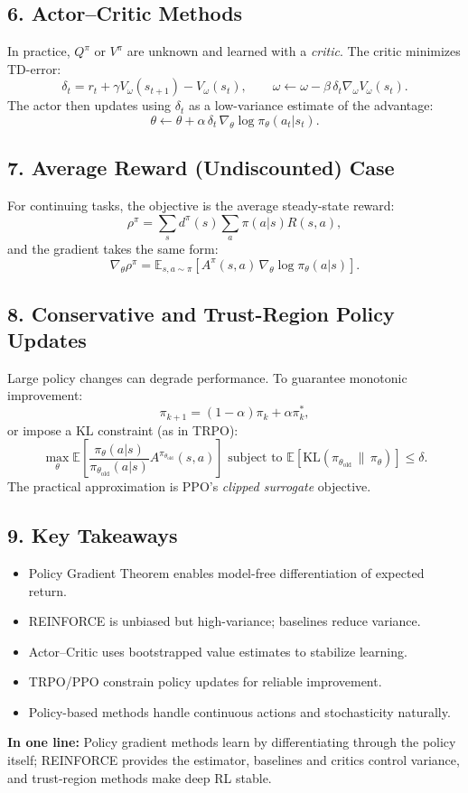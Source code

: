 \subsection*{6. Actor--Critic Methods}

In practice, $Q^\pi$ or $V^\pi$ are unknown and learned with a \emph{critic}.
The critic minimizes TD-error:
\[
		\delta_t = r_t + \gamma V_\omega(s_{t+1}) - V_\omega(s_t),
		\qquad
		\omega \leftarrow \omega - \beta \, \delta_t \nabla_\omega V_\omega(s_t).
\]
The actor then updates using $\delta_t$ as a low-variance estimate of the advantage:
\[
		\theta \leftarrow \theta + \alpha \, \delta_t \, \nabla_\theta \log \pi_\theta(a_t|s_t).
\]

\subsection*{7. Average Reward (Undiscounted) Case}

For continuing tasks, the objective is the average steady-state reward:
\[
		\rho^\pi = \sum_s d^\pi(s) \sum_a \pi(a|s) R(s,a),
\]
and the gradient takes the same form:
\[
		\nabla_\theta \rho^\pi
		= \mathbb{E}_{s,a \sim \pi}\!\left[
				A^\pi(s,a)\,\nabla_\theta \log \pi_\theta(a|s)
		\right].
\]

\subsection*{8. Conservative and Trust-Region Policy Updates}

Large policy changes can degrade performance.
To guarantee monotonic improvement:
\[
		\pi_{k+1} = (1-\alpha)\pi_k + \alpha \pi^*_k,
\]
or impose a KL constraint (as in TRPO):
\[
		\max_\theta
		\mathbb{E}\left[
				\frac{\pi_\theta(a|s)}{\pi_{\theta_{\text{old}}}(a|s)} A^{\pi_{\theta_{\text{old}}}}(s,a)
		\right]
		\text{ subject to }
		\mathbb{E}\!\left[ \mathrm{KL}(\pi_{\theta_{\text{old}}}\,\|\,\pi_\theta) \right] \le \delta.
\]
The practical approximation is PPO’s \emph{clipped surrogate} objective.

\subsection*{9. Key Takeaways}

\begin{itemize}
		\item Policy Gradient Theorem enables model-free differentiation of expected return.
		\item REINFORCE is unbiased but high-variance; baselines reduce variance.
		\item Actor--Critic uses bootstrapped value estimates to stabilize learning.
		\item TRPO/PPO constrain policy updates for reliable improvement.
		\item Policy-based methods handle continuous actions and stochasticity naturally.
\end{itemize}

\noindent
\textbf{In one line:}
Policy gradient methods learn by differentiating through the policy itself;
REINFORCE provides the estimator, baselines and critics control variance,
and trust-region methods make deep RL stable.


